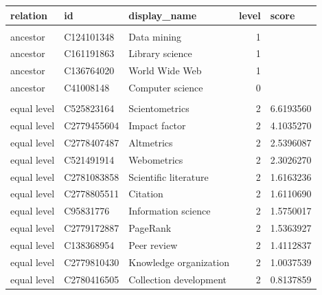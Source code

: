 \begin{table}[ht]
\begin{tabular}{lllrr}
relation    & id                               & display\_name          & \multicolumn{1}{l}{level} & \multicolumn{1}{l}{score} \\
\hline
\\
ancestor    & C124101348  & Data mining            & 1                         &                         \\
ancestor    & C161191863  & Library science        & 1                         &                         \\
ancestor    & C136764020  & World Wide Web         & 1                         &                         \\
ancestor    & C41008148   & Computer science       & 0                         &                         \\
\hline
\\
equal level & C525823164  & Scientometrics         & 2                         & 6.6193560                 \\
equal level & C2779455604 & Impact factor          & 2                         & 4.1035270                 \\
equal level & C2778407487 & Altmetrics             & 2                         & 2.5396087                 \\
equal level & C521491914  & Webometrics            & 2                         & 2.3026270                 \\
equal level & C2781083858 & Scientific literature  & 2                         & 1.6163236                 \\
equal level & C2778805511 & Citation               & 2                         & 1.6110690                 \\
equal level & C95831776   & Information science    & 2                         & 1.5750017                 \\
equal level & C2779172887 & PageRank               & 2                         & 1.5363927                 \\
equal level & C138368954  & Peer review            & 2                         & 1.4112837                 \\
equal level & C2779810430 & Knowledge organization & 2                         & 1.0037539                 \\
equal level & C2780416505 & Collection development & 2                         & 0.8137859                 \\

\end{tabular}
\end{table}
